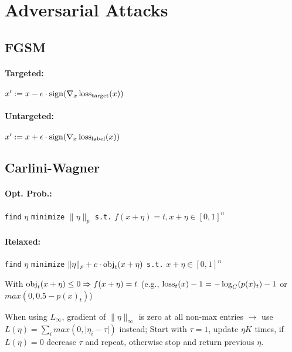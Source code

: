 \section*{Adversarial Attacks}
\subsection*{FGSM}
\paragraph{Targeted:} 
$x' := x - \epsilon \cdot \operatorname{sign}(\nabla_x \operatorname{loss}_\text{target}(x))$

\paragraph{Untargeted:}
$x' := x + \epsilon \cdot \operatorname{sign}(\nabla_x \operatorname{loss}_\text{label}(x))$

\subsection*{Carlini-Wagner}
\paragraph{Opt. Prob.:} \texttt{find} $\eta$ \texttt{minimize} $\|\eta\|_p$ \texttt{s.t.} $f(x+\eta) =t, x+\eta \in [0,1]^n$
\paragraph{Relaxed:} \texttt{find} $\eta$ \texttt{minimize} $\|\eta\|_p + c \cdot \operatorname{obj}_t(x+\eta)$ \texttt{s.t.} $x+\eta \in [0,1]^n$

With $\operatorname{obj}_t(x+\eta) \le 0 \Rightarrow f(x+\eta) = t$ (e.g., $\operatorname{loss}_t(x) - 1 = -\log_C(p(x)_t) - 1$ or $max(0, 0.5- p(x)_t)$)

When using $L_\infty$, gradient of $\|\eta\|_\infty$ is zero at all non-max entries $\rightarrow$ use $L(\eta) = \sum_i max(0, \lvert \eta_i - \tau \rvert)$ instead; Start with $\tau=1$, update $\eta K$ times, if $L(\eta) = 0$ decrease $\tau$ and repeat, otherwise stop and return previous $\eta$. 